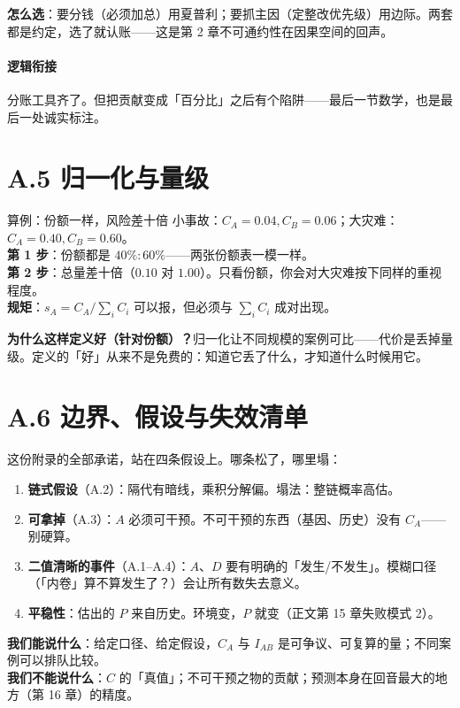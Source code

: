 \documentclass[../../main2.tex]{subfiles}
\begin{document}
\textbf{怎么选}：要分钱（必须加总）用夏普利；要抓主因（定整改优先级）用边际。两套都是约定，选了就认账——这是第 2 章不可通约性在因果空间的回声。

\paragraph*{逻辑衔接}
	分账工具齐了。但把贡献变成「百分比」之后有个陷阱——最后一节数学，也是最后一处诚实标注。

\section{A.5 归一化与量级}
\label{app:normalize}

\begin{mathbox}{算例：份额一样，风险差十倍}
	小事故：$C_A=0.04, C_B=0.06$；大灾难：$C_A=0.40, C_B=0.60$。\\
	\textbf{第 1 步}：份额都是 $40\% : 60\%$——两张份额表一模一样。\\
	\textbf{第 2 步}：总量差十倍（$0.10$ 对 $1.00$）。只看份额，你会对大灾难按下同样的重视程度。\\
	\textbf{规矩}：$s_A = C_A / \sum_i C_i$ 可以报，但必须与 $\sum_i C_i$ 成对出现。
\end{mathbox}

\textbf{为什么这样定义好（针对份额）？}归一化让不同规模的案例可比——代价是丢掉量级。定义的「好」从来不是免费的：知道它丢了什么，才知道什么时候用它。

\section{A.6 边界、假设与失效清单}

这份附录的全部承诺，站在四条假设上。哪条松了，哪里塌：

\begin{enumerate}
	\item \textbf{链式假设}（A.2）：隔代有暗线，乘积分解偏。塌法：整链概率高估。
	\item \textbf{可拿掉}（A.3）：$A$ 必须可干预。不可干预的东西（基因、历史）没有 $C_A$——别硬算。
	\item \textbf{二值清晰的事件}（A.1–A.4）：$A$、$D$ 要有明确的「发生/不发生」。模糊口径（「内卷」算不算发生了？）会让所有数失去意义。
	\item \textbf{平稳性}：估出的 $P$ 来自历史。环境变，$P$ 就变（正文第 15 章失败模式 2）。
\end{enumerate}

\textbf{我们能说什么}：给定口径、给定假设，$C_A$ 与 $I_{AB}$ 是可争议、可复算的量；不同案例可以排队比较。\\
\textbf{我们不能说什么}：$C$ 的「真值」；不可干预之物的贡献；预测本身在回音最大的地方（第 16 章）的精度。
\end{document}
